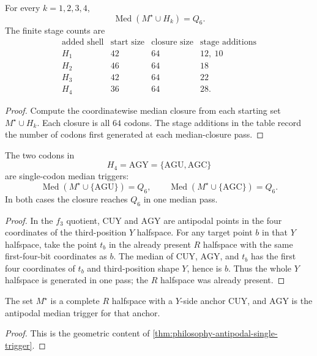 \begin{theorem}
\label{thm:philosophy-shell-triggered-median-percolation}
For every $k=1,2,3,4$,
$$
  \operatorname{Med}(M^{\star}\cup H_{k})=Q_{6}.
$$
The finite stage counts are
$$
\begin{array}{c|r|r|l}
  \text{added shell} & \text{start size} & \text{closure size}
  & \text{stage additions}\\
  \hline
  H_{1} & 42 & 64 & 12,\ 10\\
  H_{2} & 46 & 64 & 18\\
  H_{3} & 42 & 64 & 22\\
  H_{4} & 36 & 64 & 28.
\end{array}
$$
\end{theorem}
\begin{proof}
Compute the coordinatewise median closure from each starting set
$M^{\star}\cup H_{k}$. Each closure is all $64$ codons. The stage
additions in the table record the number of codons first generated at
each median-closure pass.
\end{proof}

\begin{theorem}
\label{thm:philosophy-antipodal-single-trigger}
The two codons in
$$
  H_{4}=\mathrm{AGY}=\{\mathrm{AGU},\mathrm{AGC}\}
$$
are single-codon median triggers:
$$
  \operatorname{Med}(M^{\star}\cup\{\mathrm{AGU}\})=Q_{6},
  \qquad
  \operatorname{Med}(M^{\star}\cup\{\mathrm{AGC}\})=Q_{6}.
$$
In both cases the closure reaches $Q_{6}$ in one median pass.
\end{theorem}
\begin{proof}
In the $f_{3}$ quotient, $\mathrm{CUY}$ and $\mathrm{AGY}$ are antipodal
points in the four coordinates of the third-position $Y$ halfspace. For
any target point $b$ in that $Y$ halfspace, take the point $t_{b}$ in
the already present $R$ halfspace with the same first-four-bit
coordinates as $b$. The median of $\mathrm{CUY}$, $\mathrm{AGY}$, and
$t_{b}$ has the first four coordinates of $t_{b}$ and third-position
shape $Y$, hence is $b$. Thus the whole $Y$ halfspace is generated in
one pass; the $R$ halfspace was already present.
\end{proof}

\begin{corollary}
\label{cor:philosophy-cuy-anchor-agy-antipode}
The set $M^{\star}$ is a complete $R$ halfspace with a $Y$-side anchor
$\mathrm{CUY}$, and $\mathrm{AGY}$ is the antipodal median trigger for
that anchor.
\end{corollary}
\begin{proof}
This is the geometric content of
\autoref{thm:philosophy-antipodal-single-trigger}.
\end{proof}

